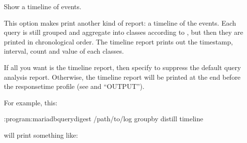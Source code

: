 \documentclass[letterpaper,10pt,english]{sphinxmanual}
\begin{document}
\begin{fulllineitems}
\label{\detokenize{mariadb-query-digest:cmdoption-mariadb-query-digest-timeline}}
\sphinxAtStartPar
Show a timeline of events.

\sphinxAtStartPar
This option makes  print another kind of report: a timeline of
the events.  Each query is still grouped and aggregate into classes according to
{\hyperref[\detokenize{mariadb-query-digest:cmdoption-mariadb-query-digest-group-by}]{}}, but then they are printed in chronological order.  The timeline
report prints out the timestamp, interval, count and value of each classes.

\sphinxAtStartPar
If all you want is the timeline report, then specify  to
suppress the default query analysis report.  Otherwise, the timeline report
will be printed at the end before the response\sphinxhyphen{}time profile
(see {\hyperref[\detokenize{mariadb-query-digest:cmdoption-mariadb-query-digest-report-format}]{}} and “OUTPUT”).

\sphinxAtStartPar
For example, this:

\begin{sphinxVerbatim}[commandchars=\\\{\}]
:program:mariadb\PYGZhy{}query\PYGZhy{}digest /path/to/log \PYGZhy{}\PYGZhy{}group\PYGZhy{}by distill \PYGZhy{}\PYGZhy{}timeline
\end{sphinxVerbatim}

\sphinxAtStartPar
will print something like:


\end{fulllineitems}
\end{document}
